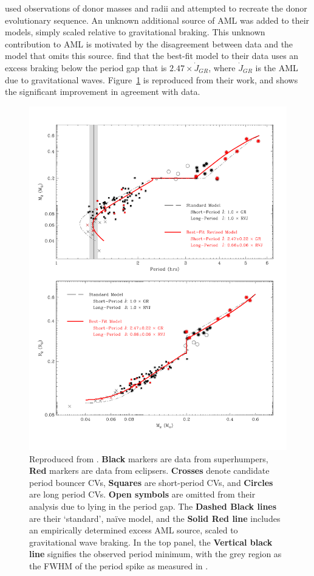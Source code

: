 \citet{knigge11} used observations of donor masses and radii and attempted to recreate the donor evolutionary sequence.
An unknown additional source of AML was added to their models, simply scaled relative to gravitational braking. This unknown contribution to AML is motivated by the disagreement between data and the model that omits this source. \citet{knigge11} find that the best-fit model to their data uses an excess braking below the period gap that is $2.47 \times \dot J_{GR}$, where $\dot J_{GR}$ is the AML due to gravitational waves. Figure~\ref{fig:introduction:Knigge 2011 figure 9} is reproduced from their work, and shows the significant improvement in agreement with data.
\begin{figure}
    \centering
    \includegraphics[width=\textwidth, trim={0 2cm 0 2cm}]{figures/introduction/Knigge11_fig9.pdf}
    \caption{Reproduced from \citet{knigge11}. {\bf Black} markers are data from superhumpers, {\bf Red} markers are data from eclipsers. {\bf Crosses} denote candidate period bouncer CVs, {\bf Squares} are short-period CVs, and {\bf Circles} are long period CVs. {\bf Open symbols} are omitted from their analysis due to lying in the period gap. The {\bf Dashed Black lines} are their `standard', na\"ive model, and the {\bf Solid Red line} includes an empirically determined excess AML source, scaled to gravitational wave braking. In the top panel, the {\bf Vertical black line} signifies the observed period minimum, with the grey region as the FWHM of the period spike as measured in \citet{gaensicke2009}.}
    \label{fig:introduction:Knigge 2011 figure 9}
\end{figure}

